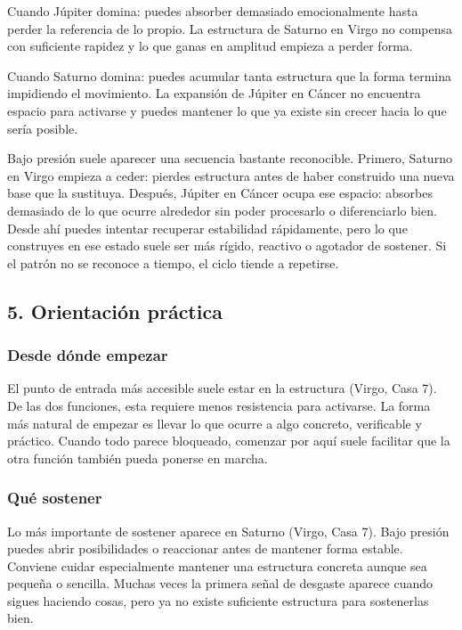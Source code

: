\documentclass[11pt,a4paper]{article}
\begin{document}
Cuando Júpiter domina: puedes absorber demasiado emocionalmente hasta perder la referencia de lo propio. La estructura de Saturno en Virgo no compensa con suficiente rapidez y lo que ganas en amplitud empieza a perder forma.

Cuando Saturno domina: puedes acumular tanta estructura que la forma termina impidiendo el movimiento. La expansión de Júpiter en Cáncer no encuentra espacio para activarse y puedes mantener lo que ya existe sin crecer hacia lo que sería posible.

Bajo presión suele aparecer una secuencia bastante reconocible. Primero, Saturno en Virgo empieza a ceder: pierdes estructura antes de haber construido una nueva base que la sustituya. Después, Júpiter en Cáncer ocupa ese espacio: absorbes demasiado de lo que ocurre alrededor sin poder procesarlo o diferenciarlo bien. Desde ahí puedes intentar recuperar estabilidad rápidamente, pero lo que construyes en ese estado suele ser más rígido, reactivo o agotador de sostener. Si el patrón no se reconoce a tiempo, el ciclo tiende a repetirse.

\vspace{0.8cm}


\subsection{5. Orientación práctica}

\subsubsection*{Desde dónde empezar}

El punto de entrada más accesible suele estar en la estructura (Virgo, Casa 7). De las dos funciones, esta requiere menos resistencia para activarse. La forma más natural de empezar es llevar lo que ocurre a algo concreto, verificable y práctico. Cuando todo parece bloqueado, comenzar por aquí suele facilitar que la otra función también pueda ponerse en marcha.

\subsubsection*{Qué sostener}

Lo más importante de sostener aparece en Saturno (Virgo, Casa 7). Bajo presión puedes abrir posibilidades o reaccionar antes de mantener forma estable. Conviene cuidar especialmente mantener una estructura concreta aunque sea pequeña o sencilla. Muchas veces la primera señal de desgaste aparece cuando sigues haciendo cosas, pero ya no existe suficiente estructura para sostenerlas bien.
\end{document}
